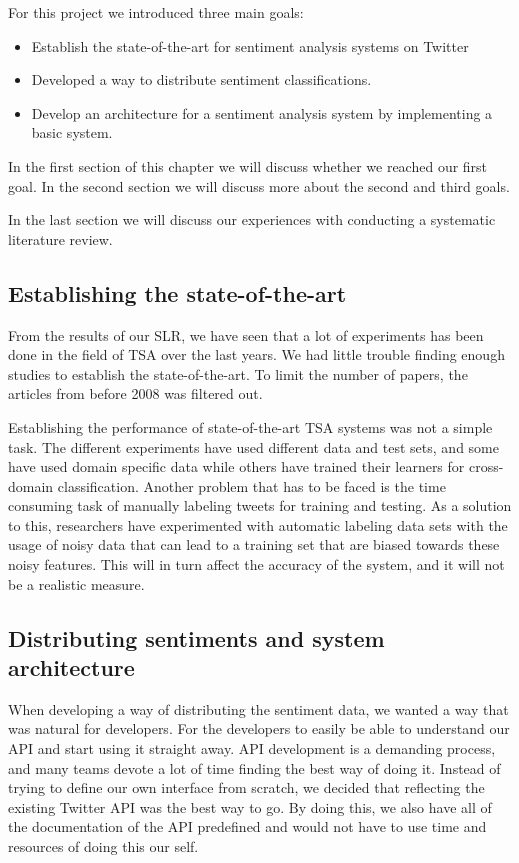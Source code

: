 
For this project we introduced three main goals:
\begin{itemize}
\item Establish the state-of-the-art for sentiment analysis systems on Twitter
\item Developed a way to distribute sentiment classifications.
\item Develop an architecture for a sentiment analysis system by implementing a basic system.
\end{itemize}

In the first section of this chapter we will discuss whether we reached our first goal. In the second section we will discuss more about the second and third goals. 

In the last section we will discuss our experiences with conducting a systematic literature review. 


\subsection{Establishing the state-of-the-art}
From the results of our SLR, we have seen that a lot of experiments has been done in the field of TSA over the last years. We had little trouble finding enough studies to establish the state-of-the-art. To limit the number of papers, the articles from before 2008 was filtered out.

Establishing the performance of state-of-the-art TSA systems was not a simple task. The different experiments have used different data and test sets, and some have used domain specific data while others have trained their learners for cross-domain classification. Another problem that has to be faced is the time consuming task of manually labeling tweets for training and testing. As a solution to this, researchers have experimented with automatic labeling data sets with the usage of noisy data that can lead to a training set that are biased towards these noisy features. This will in turn affect the accuracy of the system, and it will not be a realistic measure. 

\subsection{Distributing sentiments and system architecture}

When developing a way of distributing the sentiment data, we wanted a way that was natural for developers. For the developers to easily be able to understand our API and start using it straight away. API development is a demanding process, and many teams devote a lot of time finding the best way of doing it. Instead of trying to define our own interface from scratch, we decided that reflecting the existing Twitter API was the best way to go. By doing this, we also have all of the documentation of the API predefined and would not have to use time and resources of doing this our self. 

